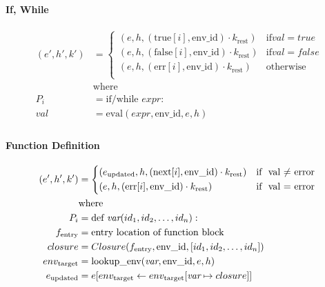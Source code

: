 \documentclass[runningheads]{llncs}
\newcommand{\lit}[1]{\textit{#1}}
\newcommand{\state}[3]{(#1, #2, #3)} %
\newcommand{\context}[2]{(#1, #2)} %
\newcommand{\lookupenv}{\text{lookup\_env}}
\newcommand{\evalexpr}{\text{eval}}
\begin{document}
\paragraph{If, While}
\begin{displaymath}
	\begin{aligned}
		\state{e'}{h'}{k'} & =
		\begin{cases*}
			\state{e}{h}{\context{\text{true}[i]}{\text{env\_id}} \cdot k_{\text{rest}}}  & \text{if} val = true  \\
			\state{e}{h}{\context{\text{false}[i]}{\text{env\_id}} \cdot k_{\text{rest}}} & \text{if} val = false \\
			\state{e}{h}{\context{\text{err}[i]}{\text{env\_id}} \cdot k_{\text{rest}}}   & \text{otherwise}      \\
		\end{cases*}
		\\
		                   & \text{where}
		\\
		P_{i}              & = \text{if/while } \lit{expr}:                \\
		val                & = \evalexpr(\lit{expr}, \text{env\_id}, e, h) \\
	\end{aligned}
\end{displaymath}

\paragraph{Function Definition}
\begin{displaymath}
	\begin{aligned}
		\state{e'}{h'}{k'}  & =
		\begin{cases*}
			\state{e_{\text{updated}}}{h}{\context{\text{next}[i]}{\text{env\_id}} \cdot k_{\text{rest}}} & \text{if } val $\neq$ error \\
			\state{e}{h}{\context{\text{err}[i]}{\text{env\_id}} \cdot k_{\text{rest}}}                   & \text{if } val = error
		\end{cases*}
		\\
		                    & \text{where}
		\\
		P_{i}               & = \text{def } \lit{var} (id_{1}, id_{2}, \ldots, id_{n}):                          \\
		f_{\text{entry}}    & = \text{entry location of function block}                                          \\
		closure             & = Closure(f_{\text{entry}}, \text{env\_id}, [id_{1}, id_{2}, \ldots, id_{n}])      \\
		env_{\text{target}} & = \lookupenv(\lit{var}, \text{env\_id}, e, h)                                      \\
		e_{\text{updated}}  & = e[env_{\text{target}} \leftarrow env_{\text{target}}[\lit{var} \mapsto closure]] \\
	\end{aligned}
\end{displaymath}
\end{document}
